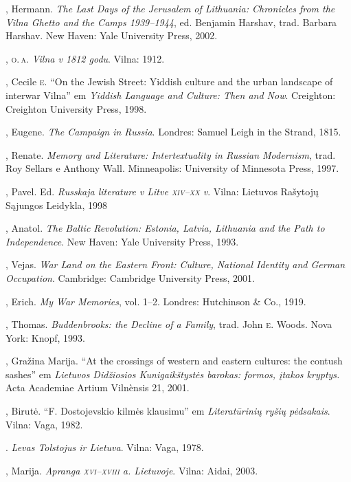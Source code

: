 \begin{bibliohedra}
  , Hermann. \textit{The Last Days of the Jerusalem of Lithuania:
  Chronicles from the Vilna Ghetto and the Camps 1939--1944}, ed.
  Benjamin Harshav, trad. Barbara Harshav. New Haven: Yale University
  Press, 2002.

  , \textsc{o.\,a.} \textit{Vilna v 1812 godu}. Vilna: 1912.

  , Cecile \textsc{e}. ``On the Jewish Street: Yiddish culture and the
  urban landscape of interwar Vilna'' em \textit{Yiddish Language and
  Culture: Then and Now}. Creighton: Creighton University Press, 1998.

  , Eugene. \textit{The Campaign in Russia}. Londres: Samuel Leigh
  in the Strand, 1815.

  , Renate. \textit{Memory and Literature: Intertextuality in
  Russian Modernism}, trad. Roy Sellars e Anthony Wall. Minneapolis:
  University of Minnesota Press, 1997.

  , Pavel. Ed. \textit{Russkaja literature v Litve \textsc{xiv}--\textsc{xx} v}.
  Vilna: Lietuvos Rašytojų Sąjungos Leidykla, 1998

  , Anatol. \textit{The Baltic Revolution: Estonia, Latvia,
  Lithuania and the Path to Independence}. New Haven: Yale University
  Press, 1993.

  , Vejas. \textit{War Land on the Eastern Front: Culture,
  National Identity and German Occupation}. Cambridge: Cambridge
  University Press, 2001.

  , Erich. \textit{My War Memories}, vol. 1--2. Londres:
  Hutchinson \& Co., 1919.

  , Thomas. \textit{Buddenbrooks: the Decline of a Family}, trad. John
  \textsc{e}. Woods. Nova York: Knopf, 1993.

  , Gražina Marija. ``At the crossings of western and
  eastern cultures: the contush sashes'' em \textit{Lietuvos Didžiosios
  Kunigaikštystės barokas: formos, įtakos kryptys.} Acta Academiae
  Artium Vilnènsis 21, 2001.

  , Birutė. ``F. Dostojevskio kilmės klausimu'' em
  \textit{Literatūrinių ryšių pėdsakais}. Vilna: Vaga, 1982.

  \titidem. \textit{Levas Tolstojus ir Lietuva}. Vilna: Vaga,
  1978.

  , Marija. \textit{Apranga \textsc{xvi}--\textsc{xviii} a. Lietuvoje}. Vilna:
  Aidai, 2003.


\end{bibliohedra}

